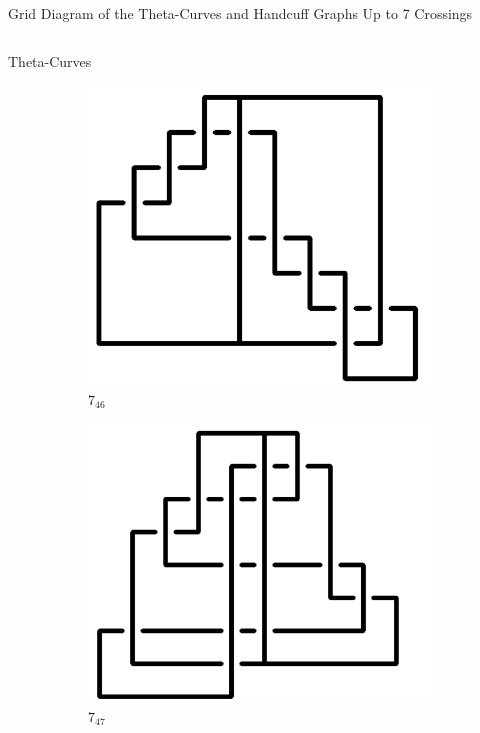 \documentclass[final]{beamer}
\begin{document}
\begin{frame}[t]
\begin{alertblock}{Grid Diagram of the Theta-Curves and Handcuff Graphs Up to 7 Crossings}
\begin{columns}[t]
\begin{column}{0.5\textwidth}
\begin{alertblock}{Theta-Curves}
\begin{figure}
    \begin{subfigure}{0.075\textwidth}
    \includegraphics[width=\columnwidth]{../Midterm_Poster/grid_diagram/theta_7_46.png}
    \caption{$7_{46}$} 
    \end{subfigure}
    \begin{subfigure}{0.075\textwidth}
    \includegraphics[width=\columnwidth]{../Midterm_Poster/grid_diagram/theta_7_47.png}
    \caption{$7_{47}$} 
    \end{subfigure}
    \begin{subfigure}{0.075\textwidth}

\end{subfigure}
\end{figure}
\end{alertblock}
\end{column}
\end{columns}
\end{alertblock}
\end{frame}
\end{document}
